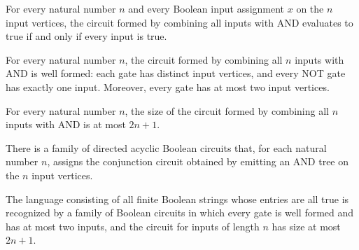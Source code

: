 \begin{theorem}
\label{BoolCircuit.andAllDAG_eval}
\leanok
{}
For every natural number $n$ and every Boolean input assignment $x$ on the $n$ input
vertices, the circuit formed by combining all inputs with AND evaluates to true if and
only if every input is true.
\end{theorem}

\begin{theorem}
\label{BoolCircuit.andAllDAG_isFaninTwo}
\leanok
{}
For every natural number $n$, the circuit formed by combining all $n$ inputs with AND is
well formed: each gate has distinct input vertices, and every NOT gate has exactly one
input. Moreover, every gate has at most two input vertices.
\end{theorem}

\begin{theorem}
\label{BoolCircuit.andAllDAG_size_le}
\leanok
{}
For every natural number $n$, the size of the circuit formed by combining all $n$ inputs
with AND is at most $2n+1$.
\end{theorem}

\begin{definition}
\label{BoolCircuit.andAllFamily}
\leanok
{}
There is a family of directed acyclic Boolean circuits that, for each natural number
$n$, assigns the conjunction circuit obtained by emitting an AND tree on the $n$ input
vertices.
\end{definition}

\begin{theorem}
\label{Language.allOnes_inSIZE_linear}
\leanok
{}
The language consisting of all finite Boolean strings whose entries are all true is
recognized by a family of Boolean circuits in which every gate is well formed and has at
most two inputs, and the circuit for inputs of length $n$ has size at most $2n+1$.
\end{theorem}

